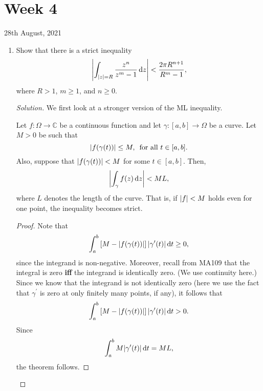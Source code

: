 \documentclass[11pt]{article}
\theoremstyle{definition}
\newenvironment{soln}{\begin{proof}[Solution]}{\end{proof}}
\begin{document}
\newpage

\section{Week 4}

\begin{center}
    28th August, 2021
\end{center}
\begin{enumerate}[leftmargin=*]
    \itemsep0.5em
    \item Show that there is a strict inequality
    \[
        \abs{\int_{\abs{z} = R} \frac{z^n}{z^m - 1} \, \mathrm{d}z} < \frac{2\pi R^{n+1}}{R^m - 1},
    \]
    where $R > 1$, $m \geq 1$, and $n \geq 0$.
    
    \begin{soln}
        We first look at a stronger version of the ML inequality. 
        
        \begin{thm}
            Let $f \colon \Omega \to \mathbb{C}$ be a continuous function and let $\gamma \colon [a,b] \to \Omega$ be a curve. Let $M > 0$ be such that 
            \[
                \abs{f(\gamma(t))} \leq M, \, \text{ for all } t \in [a,b].
            \]
            Also, suppose that $\abs{f(\gamma(t))} < M$ for some $t \in [a,b]$. Then,
            \[
                \abs{\int_{\gamma} f(z) \, \mathrm{d}z} < ML,
            \]
            where $L$ denotes the length of the curve. That is, if $\abs{f} < M$ holds even for one point, the inequality becomes strict.
        \end{thm}
        \begin{proof}
            Note that
            \[
                \int_a^b \left[ M - \abs{f(\gamma(t))} \right] \abs{\gamma^{\prime}(t)} \, \mathrm{d}t \geq 0,
            \]
            since the integrand is non-negative. Moreover, recall from MA109 that the integral is zero \textbf{iff} the integrand is identically zero. (We use continuity here.) Since we know that the integrand is not identically zero (here we use the fact that $\gamma^{\prime}$ is zero at only finitely many points, if any), it follows that
            \[
                \int_a^b \left[ M - \abs{f(\gamma(t))} \right] \abs{\gamma^{\prime}(t)} \, \mathrm{d}t > 0.
            \]
            Since
            \[
                \int_a^b M \abs{\gamma^{\prime}(t)} \, \mathrm{d}t = ML,
            \]
            the theorem follows.
        \end{proof}
        

\end{soln}
\end{enumerate}
\end{document}
